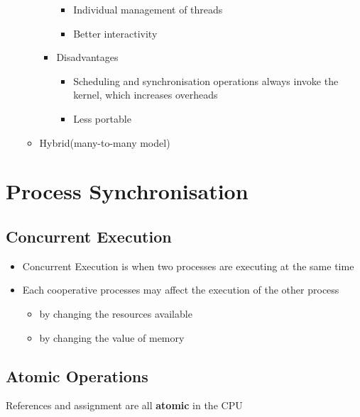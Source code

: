 \documentclass[11pt]{article}
\theoremstyle{definition}
\begin{document}
\begin{itemize}
\begin{itemize}
\begin{itemize}
                            \begin{itemize}
                                \item Individual management of threads
                                \item Better interactivity
                            \end{itemize}
                            \item Disadvantages
                            \begin{itemize}
                                \item Scheduling and synchronisation operations always invoke the kernel, which increases overheads
                                \item Less portable
                            \end{itemize}
                        \end{itemize}
                        \item Hybrid(many-to-many model)
                    \end{itemize}
            \end{itemize}
    \section{Process Synchronisation}
    \subsection{Concurrent Execution}
        \begin{itemize}
            \item Concurrent Execution is when two processes are executing at the same time
            \item Each cooperative processes may affect the execution of the other process
                \begin{itemize}
                    \item by changing the resources available
                    \item by changing the value of memory
                \end{itemize}
        \end{itemize}
    \subsection{Atomic Operations}
        \note References and assignment are all \textbf{atomic} in the CPU
\end{document}
